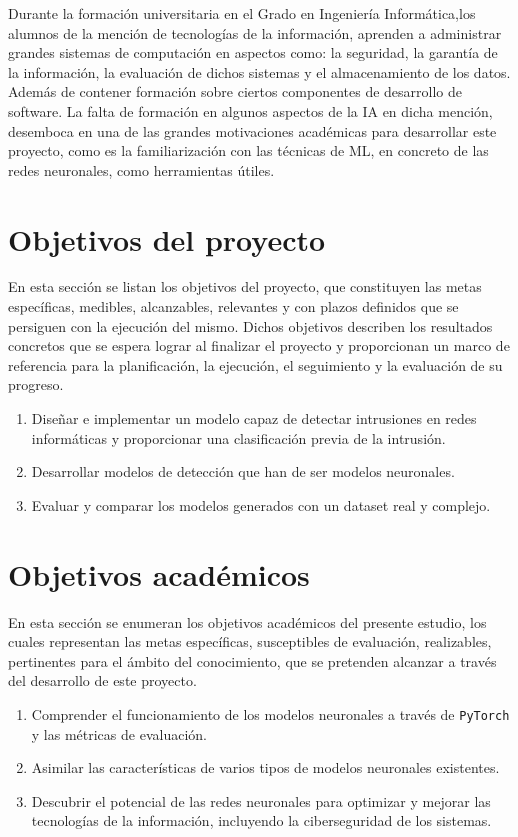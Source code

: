 Durante la formación universitaria en el Grado en Ingeniería Informática,los alumnos
de la mención de tecnologías de la información, aprenden a administrar grandes sistemas de computación en aspectos como: la seguridad, la garantía de la información, la evaluación de dichos sistemas y el almacenamiento de los datos. Además de contener formación sobre ciertos componentes de desarrollo de software. La falta de formación en algunos aspectos de la IA en dicha mención, desemboca en una de las grandes motivaciones académicas para desarrollar este proyecto, como es la familiarización con las técnicas de ML, en concreto de las redes neuronales, como herramientas útiles.

 
\section{Objetivos del proyecto} \label{sec.objetivos-pro}
En esta sección se listan los objetivos del proyecto, que constituyen las metas específicas, medibles, alcanzables, relevantes y con plazos definidos que se persiguen con la ejecución del mismo. Dichos objetivos describen los resultados concretos que se espera lograr al finalizar el proyecto y proporcionan un marco de referencia para la planificación, la ejecución, el seguimiento y la evaluación de su progreso.

\begin{enumerate}
	\item Diseñar e implementar un modelo capaz de detectar intrusiones en redes informáticas y proporcionar una clasificación previa de la intrusión.
	\item Desarrollar modelos de detección que han de ser modelos neuronales.
	\item Evaluar y comparar los modelos generados con un dataset real y complejo.
\end{enumerate}

\section{Objetivos académicos} \label{sec.objetivos-aca}
En esta sección se enumeran los objetivos académicos del presente estudio, los cuales representan las metas específicas, susceptibles de evaluación, realizables, pertinentes para el ámbito del conocimiento, que se pretenden alcanzar a través del desarrollo de este proyecto. 

\begin{enumerate}
	\item Comprender el funcionamiento de los modelos neuronales a través de \texttt{PyTorch} y las métricas de evaluación.
	\item Asimilar las características de varios tipos de modelos neuronales existentes.
	\item Descubrir el potencial de las redes neuronales para optimizar y mejorar las tecnologías de la información, incluyendo la ciberseguridad de los sistemas.

\end{enumerate}


